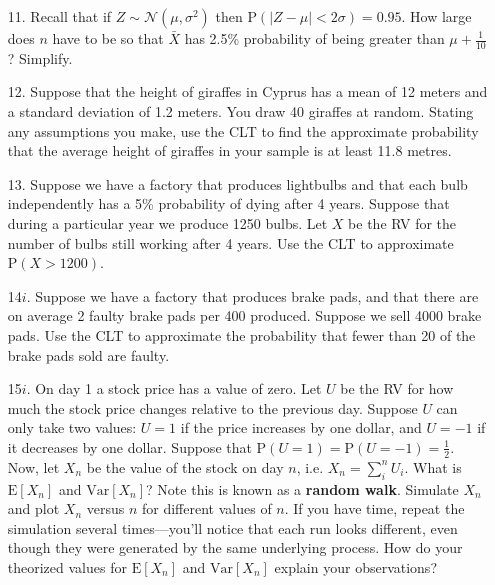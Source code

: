 \documentclass[10pt]{extarticle}
\newcommand{\E}{\text{E}}
\newcommand{\Var}{\text{Var}}
\renewcommand{\P}{\text{P}}
\begin{document}
\hfill 

\begin{itemize}

	\item[11.] Recall that if $Z \sim \mathcal N(\mu, \sigma^2)$ then $\P(| Z - \mu| < 2\sigma) = 0.95$. How large does $n$ have to be so that $\bar X$ has 2.5\% probability of being greater than $\mu + \frac{1}{10}$? Simplify. \\ 

	\item[12.] Suppose that the height of giraffes in Cyprus has a mean of 12 meters and a standard deviation of 1.2 meters. You draw 40 giraffes at random. Stating any assumptions you make, use the CLT to find the approximate probability that the average height of giraffes in your sample is at least 11.8 metres. \\

	\item[13.] Suppose we have a factory that produces lightbulbs and that each bulb independently has a 5\% probability of dying after 4 years. Suppose that during a particular year we produce 1250 bulbs. Let $X$ be the RV for the number of bulbs still working after 4 years. Use the CLT to approximate $\P(X > 1200)$. \\  

	\item[14$i$.] Suppose we have a factory that produces brake pads, and that there are on average 2 faulty brake pads per 400 produced. Suppose we sell 4000 brake pads. Use the CLT to approximate the probability that fewer than 20 of the brake pads sold are faulty. \\  

	\item[15$i$.] On day 1 a stock price has a value of zero. Let $U$ be the RV for how much the stock price changes relative to the previous day. Suppose $U$ can only take two values: $U=1$ if the price increases by one dollar, and $U = -1$ if it decreases by one dollar. Suppose that $\P(U=1) = \P(U=-1) = \frac 12$. Now, let $X_n$ be the value of the stock on day $n$, i.e. $X_n = \sum_i^n U_i$. What is $\E[X_n]$ and $\Var[X_n]$? Note this is known as a {\bf random walk}. Simulate $X_n$ and plot $X_n$ versus $n$ for different values of $n$. If you have time, repeat the simulation several times---you'll notice that each run looks different, even though they were generated by the same underlying process. How do your theorized values for $\E[X_n]$ and $\Var[X_n]$ explain your observations? 

\end{itemize}
\end{document}
